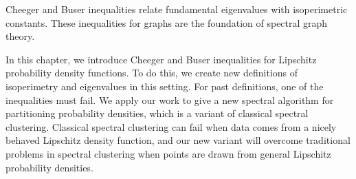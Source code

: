 Cheeger and Buser inequalities relate fundamental eigenvalues with
isoperimetric constants. These inequalities for graphs are the
foundation of spectral graph theory. 

In this chapter, we introduce Cheeger and Buser inequalities for Lipschitz
probability density functions. To do this, we create new definitions of
isoperimetry and eigenvalues in this setting. For past
definitions, one of the inequalities must fail. We apply our work to
give a new spectral algorithm for partitioning probability densities,
which is a variant of classical spectral clustering. Classical spectral
clustering can fail when data comes from a nicely behaved Lipschitz
  density function, and our new variant will overcome traditional
  problems in spectral clustering when points are drawn from general
Lipschitz probability densities.  
